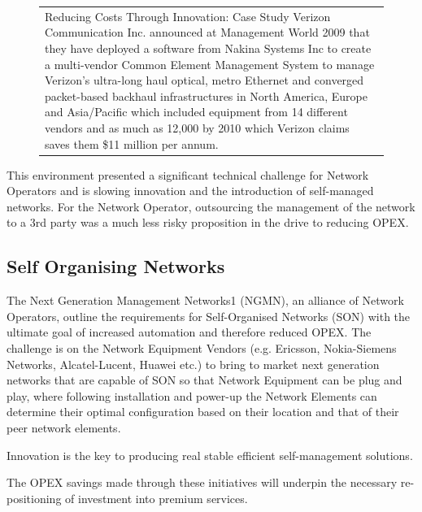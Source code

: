 \begin{figure}

\begin{tabularx}{0.5\textwidth}{|p{}|}
Reducing Costs Through Innovation: Case Study
Verizon Communication Inc. announced at Management World 2009 that they have deployed a software from Nakina Systems Inc to create a multi-vendor Common Element Management System to manage Verizon’s ultra-long haul optical, metro Ethernet and converged packet-based backhaul infrastructures in North America, Europe and Asia/Pacific which included equipment from 14 different vendors and as much as 12,000 by 2010 which Verizon claims saves them \$11 million per annum. \\
\end{tabularx}
\vspace{-20pt}

\end{figure}


This environment presented a significant technical challenge for Network Operators and is slowing innovation and the introduction of self-managed networks. For the Network Operator, outsourcing the management of the network to a 3rd party was a much less risky proposition in the drive to reducing OPEX.

\subsection{Self Organising Networks}
The Next Generation Management Networks1 (NGMN), an alliance of Network Operators, outline the requirements for Self-Organised Networks (SON) with the ultimate goal of increased automation and therefore reduced OPEX. The challenge is on the Network Equipment Vendors (e.g. Ericsson, Nokia-Siemens Networks, Alcatel-Lucent, Huawei etc.) to bring to market next generation networks that are capable of SON so that Network Equipment can be plug and play, where following installation and power-up the Network Elements can determine their optimal configuration based on their location and that of their peer network elements. 

Innovation is the key to producing real stable efficient self-management solutions.

The OPEX savings made through these initiatives will underpin the necessary re-positioning of investment into premium services.
